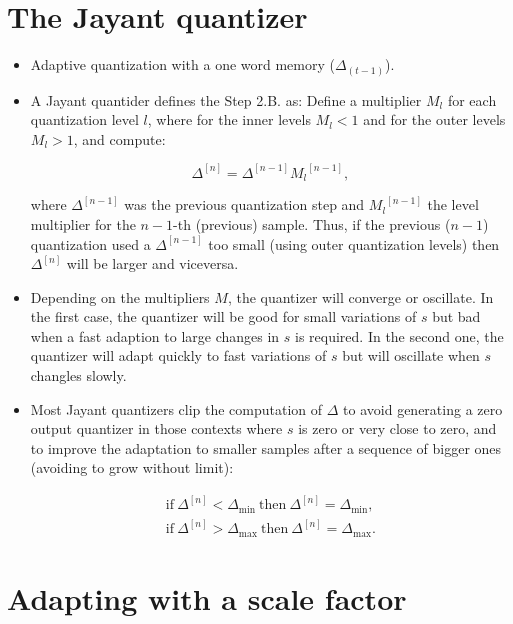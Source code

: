 
\section{The Jayant quantizer~\cite{jayant1974digital}}

\begin{itemize}
\item
  Adaptive quantization with a one word memory (\(\Delta_{(t-1)}\)).
\item
  A Jayant quantider defines the Step 2.B. as: Define a multiplier
  \(M_l\) for each quantization level \(l\), where for the inner levels
  \(M_l<1\) and for the outer levels \(M_l>1\), and compute:

  \[
    \Delta^{[n]} = \Delta^{[n-1]}{M_l}^{[n-1]},
  \]

  where \(\Delta^{[n-1]}\) was the previous quantization step and
  \({M_l}^{[n-1]}\) the level multiplier for the \(n-1\)-th (previous)
  sample. Thus, if the previous (\(n-1\)) quantization used a
  \(\Delta^{[n-1]}\) too small (using outer quantization levels) then
  \(\Delta^{[n]}\) will be larger and viceversa.
\item
  Depending on the multipliers \(M\), the quantizer will converge or
  oscillate. In the first case, the quantizer will be good for small
  variations of \(s\) but bad when a fast adaption to large changes in
  \(s\) is required. In the second one, the quantizer will adapt quickly
  to fast variations of \(s\) but will oscillate when \(s\) changles
  slowly.
\item
  Most Jayant quantizers clip the computation of \(\Delta\) to avoid
  generating a zero output quantizer in those contexts where \(s\) is
  zero or very close to zero, and to improve the adaptation to smaller
  samples after a sequence of bigger ones (avoiding to grow without
  limit):

  \[
  \begin{array}{ll}
    \text{if}~\Delta^{[n]}<\Delta_{\text{min}}~\text{then}~\Delta^{[n]} = \Delta_{\text{min}},\\
    \text{if}~\Delta^{[n]}>\Delta_{\text{max}}~\text{then}~\Delta^{[n]} = \Delta_{\text{max}}.
  \end{array}
  \]
\end{itemize}


\section{Adapting with a scale factor}

